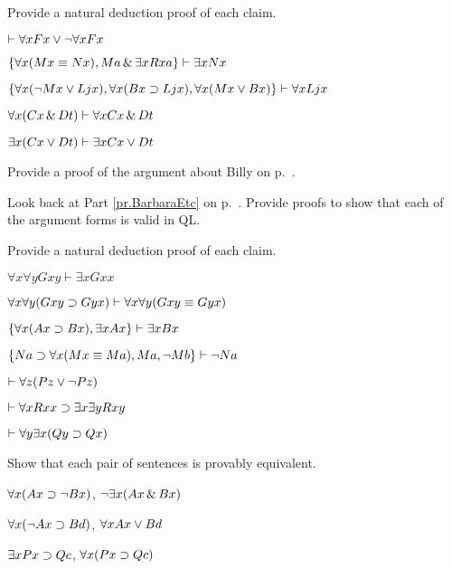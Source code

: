 \solutions
\problempart
\label{pr.someQLproofs}
Provide a natural deduction proof of each claim.
\begin{earg}
\item $\vdash \forall x Fx \vee \neg \forall x Fx$
\item $\{\forall x(Mx \equiv Nx), Ma\,\&\,\exists x Rxa\}\vdash \exists x Nx$
\item $\{\forall x(\neg Mx \vee Ljx), \forall x(Bx\supset Ljx), \forall x(Mx\vee Bx)\}\vdash \forall xLjx$
\item $\forall x(Cx \,\&\, Dt)\vdash \forall xCx \,\&\, Dt$
\item $\exists x(Cx \vee Dt)\vdash \exists x Cx \vee Dt$
\end{earg}

\problempart
Provide a proof of the argument about Billy on p.~\pageref{surgeon2}.



\problempart
\label{pr.BarbaraEtc.proof1}
Look back at Part \ref{pr.BarbaraEtc} on p.~\pageref{pr.BarbaraEtc}. Provide proofs to show that each of the argument forms is valid in QL.




\solutions
\problempart
\label{pr.QLproofsNDe}
Provide a natural deduction proof of each claim.
\begin{earg}
\item $\forall x \forall y Gxy\vdash\exists x Gxx$
\item $\forall x \forall y (Gxy \supset Gyx) \vdash \forall x\forall y (Gxy \equiv Gyx)$
\item $\{\forall x(Ax\supset Bx), \exists x Ax\} \vdash \exists x Bx$
\item $\{Na \supset \forall x(Mx \equiv Ma), Ma, \neg Mb\}\vdash \neg Na$
\item $\vdash\forall z (Pz \vee \neg Pz)$
\item $\vdash\forall x Rxx\supset \exists x \exists y Rxy$
\item $\vdash\forall y \exists x (Qy \supset Qx)$
\end{earg}



\problempart
Show that each pair of sentences is provably equivalent.
\begin{earg}
\item $\forall x (Ax\supset \neg Bx)$, $\neg\exists x(Ax \,\&\, Bx)$
\item $\forall x (\neg Ax\supset Bd)$, $\forall x Ax \vee Bd$
\item $\exists x Px \supset Qc$, $\forall x (Px \supset Qc)$
\end{earg}



